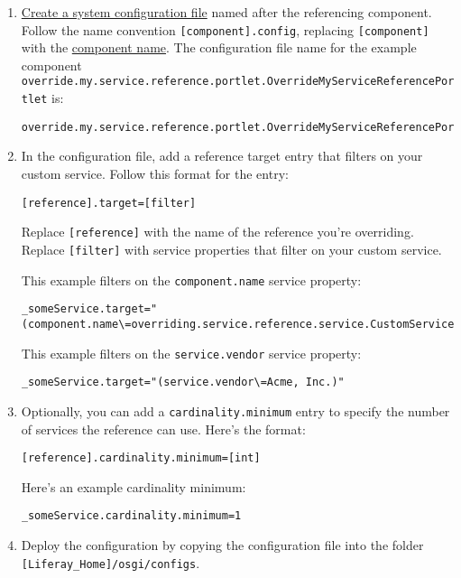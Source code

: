 \begin{enumerate}
\def\labelenumi{\arabic{enumi}.}
\item
  \href{/docs/7-2/user/-/knowledge_base/u/understanding-system-configuration-files}{Create
  a system configuration file} named after the referencing component.
  Follow the name convention \texttt{{[}component{]}.config}, replacing
  \texttt{{[}component{]}} with the
  \href{/docs/7-2/customization/-/knowledge_base/c/examining-an-osgi-service-to-override\#step-3-gather-reference-configuration-details-if-reconfiguration-is-needed}{component
  name}. The configuration file name for the example component
  \texttt{override.my.service.reference.portlet.OverrideMyServiceReferencePortlet}
  is:

\begin{verbatim}
override.my.service.reference.portlet.OverrideMyServiceReferencePortlet.config
\end{verbatim}
\item
  In the configuration file, add a reference target entry that filters
  on your custom service. Follow this format for the entry:

\begin{verbatim}
[reference].target=[filter]
\end{verbatim}

  Replace \texttt{{[}reference{]}} with the name of the reference you're
  overriding. Replace \texttt{{[}filter{]}} with service properties that
  filter on your custom service.

  This example filters on the \texttt{component.name} service property:

\begin{verbatim}
_someService.target="(component.name\=overriding.service.reference.service.CustomServiceImpl)" 
\end{verbatim}

  This example filters on the \texttt{service.vendor} service property:

\begin{verbatim}
_someService.target="(service.vendor\=Acme, Inc.)"
\end{verbatim}
\item
  Optionally, you can add a \texttt{cardinality.minimum} entry to
  specify the number of services the reference can use. Here's the
  format:

\begin{verbatim}
[reference].cardinality.minimum=[int]
\end{verbatim}

  Here's an example cardinality minimum:

\begin{verbatim}
_someService.cardinality.minimum=1
\end{verbatim}
\item
  Deploy the configuration by copying the configuration file into the
  folder \texttt{{[}Liferay\_Home{]}/osgi/configs}.
\end{enumerate}

